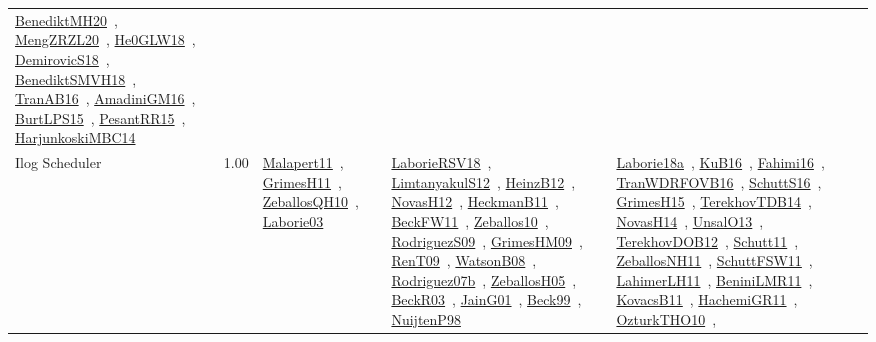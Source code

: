 {\begin{longtable}{p{3cm}r>{\raggedright\arraybackslash}p{6cm}>{\raggedright\arraybackslash}p{6cm}>{\raggedright\arraybackslash}p{8cm}}
\href{../works/BenediktMH20.pdf}{BenediktMH20}~\cite{BenediktMH20}, \href{../works/MengZRZL20.pdf}{MengZRZL20}~\cite{MengZRZL20}, \href{../works/He0GLW18.pdf}{He0GLW18}~\cite{He0GLW18}, \href{../works/DemirovicS18.pdf}{DemirovicS18}~\cite{DemirovicS18}, \href{../works/BenediktSMVH18.pdf}{BenediktSMVH18}~\cite{BenediktSMVH18}, \href{../works/TranAB16.pdf}{TranAB16}~\cite{TranAB16}, \href{../works/AmadiniGM16.pdf}{AmadiniGM16}~\cite{AmadiniGM16}, \href{../works/BurtLPS15.pdf}{BurtLPS15}~\cite{BurtLPS15}, \href{../works/PesantRR15.pdf}{PesantRR15}~\cite{PesantRR15}, \href{../works/HarjunkoskiMBC14.pdf}{HarjunkoskiMBC14}~\cite{HarjunkoskiMBC14}\\
\index{Ilog Scheduler}\index{CPSystems!Ilog Scheduler}Ilog Scheduler &  1.00 & \href{../works/Malapert11.pdf}{Malapert11}~\cite{Malapert11}, \href{../works/GrimesH11.pdf}{GrimesH11}~\cite{GrimesH11}, \href{../works/ZeballosQH10.pdf}{ZeballosQH10}~\cite{ZeballosQH10}, \href{../works/Laborie03.pdf}{Laborie03}~\cite{Laborie03} & \href{../works/LaborieRSV18.pdf}{LaborieRSV18}~\cite{LaborieRSV18}, \href{../works/LimtanyakulS12.pdf}{LimtanyakulS12}~\cite{LimtanyakulS12}, \href{../works/HeinzB12.pdf}{HeinzB12}~\cite{HeinzB12}, \href{../works/NovasH12.pdf}{NovasH12}~\cite{NovasH12}, \href{../works/HeckmanB11.pdf}{HeckmanB11}~\cite{HeckmanB11}, \href{../works/BeckFW11.pdf}{BeckFW11}~\cite{BeckFW11}, \href{../works/Zeballos10.pdf}{Zeballos10}~\cite{Zeballos10}, \href{../works/RodriguezS09.pdf}{RodriguezS09}~\cite{RodriguezS09}, \href{../works/GrimesHM09.pdf}{GrimesHM09}~\cite{GrimesHM09}, \href{../works/RenT09.pdf}{RenT09}~\cite{RenT09}, \href{../works/WatsonB08.pdf}{WatsonB08}~\cite{WatsonB08}, \href{../works/Rodriguez07b.pdf}{Rodriguez07b}~\cite{Rodriguez07b}, \href{../works/ZeballosH05.pdf}{ZeballosH05}~\cite{ZeballosH05}, \href{../works/BeckR03.pdf}{BeckR03}~\cite{BeckR03}, \href{../works/JainG01.pdf}{JainG01}~\cite{JainG01}, \href{../works/Beck99.pdf}{Beck99}~\cite{Beck99}, \href{../works/NuijtenP98.pdf}{NuijtenP98}~\cite{NuijtenP98} & \href{../works/Laborie18a.pdf}{Laborie18a}~\cite{Laborie18a}, \href{../works/KuB16.pdf}{KuB16}~\cite{KuB16}, \href{../works/Fahimi16.pdf}{Fahimi16}~\cite{Fahimi16}, \href{../works/TranWDRFOVB16.pdf}{TranWDRFOVB16}~\cite{TranWDRFOVB16}, \href{../works/SchuttS16.pdf}{SchuttS16}~\cite{SchuttS16}, \href{../works/GrimesH15.pdf}{GrimesH15}~\cite{GrimesH15}, \href{../works/TerekhovTDB14.pdf}{TerekhovTDB14}~\cite{TerekhovTDB14}, \href{../works/NovasH14.pdf}{NovasH14}~\cite{NovasH14}, \href{../works/UnsalO13.pdf}{UnsalO13}~\cite{UnsalO13}, \href{../works/TerekhovDOB12.pdf}{TerekhovDOB12}~\cite{TerekhovDOB12}, \href{../works/Schutt11.pdf}{Schutt11}~\cite{Schutt11}, \href{../works/ZeballosNH11.pdf}{ZeballosNH11}~\cite{ZeballosNH11}, \href{../works/SchuttFSW11.pdf}{SchuttFSW11}~\cite{SchuttFSW11}, \href{../works/LahimerLH11.pdf}{LahimerLH11}~\cite{LahimerLH11}, \href{../works/BeniniLMR11.pdf}{BeniniLMR11}~\cite{BeniniLMR11}, \href{../works/KovacsB11.pdf}{KovacsB11}~\cite{KovacsB11}, \href{../works/HachemiGR11.pdf}{HachemiGR11}~\cite{HachemiGR11}, \href{../works/OzturkTHO10.pdf}{OzturkTHO10}~\cite{OzturkTHO10}, 
\end{longtable}}

